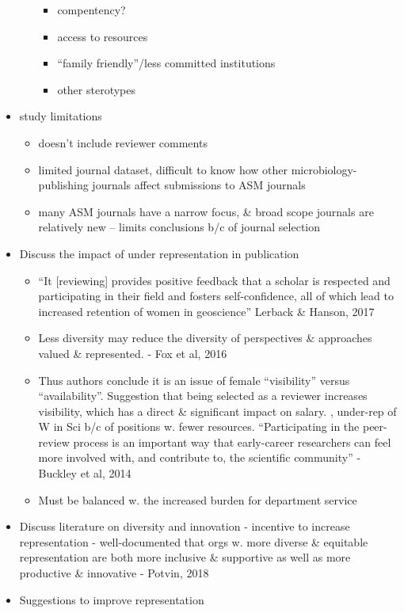 \documentclass[11pt,]{article}
\providecommand{\tightlist}{%
  \setlength{\itemsep}{0pt}\setlength{\parskip}{0pt}}
\begin{document}
\begin{itemize}
\begin{itemize}
    \begin{itemize}
    \tightlist
    \item
      compentency?
    \item
      access to resources
    \item
      ``family friendly''/less committed institutions
    \item
      other sterotypes
    \end{itemize}
  \end{itemize}
\item
  study limitations

  \begin{itemize}
  \tightlist
  \item
    doesn't include reviewer comments
  \item
    limited journal dataset, difficult to know how other
    microbiology-publishing journals affect submissions to ASM journals
  \item
    many ASM journals have a narrow focus, \& broad scope journals are
    relatively new -- limits conclusions b/c of journal selection
  \end{itemize}
\item
  Discuss the impact of under representation in publication

  \begin{itemize}
  \tightlist
  \item
    ``It {[}reviewing{]} provides positive feedback that a scholar is
    respected and participating in their field and fosters
    self-confidence, all of which lead to increased retention of women
    in geoscience'' Lerback \& Hanson, 2017
  \item
    Less diversity may reduce the diversity of perspectives \&
    approaches valued \& represented. - Fox et al, 2016
  \item
    Thus authors conclude it is an issue of female ``visibility'' versus
    ``availability''. Suggestion that being selected as a reviewer
    increases visibility, which has a direct \& significant impact on
    salary. , under-rep of W in Sci b/c of positions w. fewer resources.
    ``Participating in the peer-review process is an important way that
    early-career researchers can feel more involved with, and contribute
    to, the scientific community'' - Buckley et al, 2014
  \item
    Must be balanced w. the increased burden for department service
  \end{itemize}
\item
  Discuss literature on diversity and innovation - incentive to increase
  representation - well-documented that orgs w. more diverse \&
  equitable representation are both more inclusive \& supportive as well
  as more productive \& innovative - Potvin, 2018
\item
  Suggestions to improve representation


\end{itemize}
\end{document}
